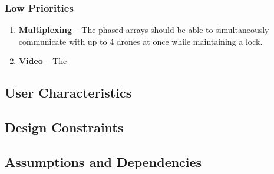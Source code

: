 \documentclass[ProjectRequirements.tex]{subfiles}
\begin{document}
		\subsubsection{Low Priorities}
			\begin{enumerate}
				\item \textbf{Multiplexing} -- The phased arrays should be able to simultaneously communicate with up to 4 drones at once while maintaining a lock.
				\item \textbf{Video} -- The 
			\end{enumerate}
		
	\subsection{User Characteristics}
	
	\subsection{Design Constraints}
	
	\subsection{Assumptions and Dependencies}
	
\end{document}
